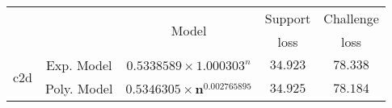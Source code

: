 \begin{tabular}{ccccc} 
\hline 
 &  & \multirow{2}{*}{Model} & Support & Challenge\tabularnewline 
 &  &  & loss  & loss\tabularnewline 
\hline 
\hline 
\multirow{2}{*}{c2d} & Exp. Model & $0.5338589\times 1.000303^{n}$ & $34.923$ & $78.338$ \tabularnewline 
 & Poly. Model & $\mathbf{0.5346305\times n^{0.002765895}}$ & $\mathbf{34.925}$ & $\mathbf{78.184}$ \tabularnewline 
\hline 
\end{tabular} 

